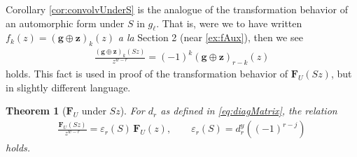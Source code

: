 \documentclass[11pt]{article}
\newtheorem{thm}{Theorem}
\begin{document}
    
Corollary \ref{cor:convolvUnderS} is the analogue of the transformation behavior of an automorphic form under $ S $ in $ g_\ell $. That is, were we to have written $ f_k(z) = (\mathbf{g}\oplus\mathbf{z})_k(z) $ \emph{a la} Section 2 (near \eqref{ex:fAux}), then we see  
    \begin{eqnarray*}
        \frac{(\mathbf{g}\oplus\mathbf{z})_k(Sz)}{z^{w-r}} = (-1)^k (\mathbf{g}\oplus\mathbf{z})_{r-k}(z)
    \end{eqnarray*}
holds. This fact is used in proof  of the transformation behavior of $ \mathbf{F}_U (Sz) $, but in slightly different language.
    

    \begin{thm}[$ \mathbf{F}_U $ under $ Sz $]\label{thm:vectorFormUnderS}
        For $ d_r $ as defined in \eqref{eq:diagMatrix}, the relation
            \begin{eqnarray}\label{eq:FUnderS}
                \frac{\mathbf{F}_U(Sz)}{z^{w-r}} = \varepsilon_r(S)\, \mathbf{F}_{U}(z), \qquad \varepsilon_r(S) = d_r^y((-1)^{r-j})  
            \end{eqnarray}
        holds.
    \end{thm}
\end{document}
